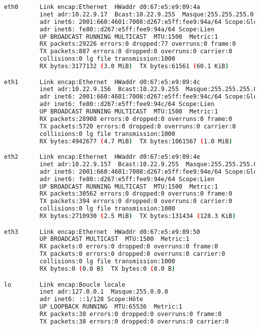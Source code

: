 \documentclass[french]{article}
\begin{document}
\begin{lstlisting}[language=bash,caption={ifconfig},frame=single]
eth0      Link encap:Ethernet  HWaddr d0:67:e5:e9:09:4a  
          inet adr:10.22.9.17  Bcast:10.22.9.255  Masque:255.255.255.0
          adr inet6: 2001:660:4601:7008:d267:e5ff:fee9:94a/64 Scope:Global
          adr inet6: fe80::d267:e5ff:fee9:94a/64 Scope:Lien
          UP BROADCAST RUNNING MULTICAST  MTU:1500  Metric:1
          RX packets:29226 errors:0 dropped:77 overruns:0 frame:0
          TX packets:887 errors:0 dropped:0 overruns:0 carrier:0
          collisions:0 lg file transmission:1000 
          RX bytes:3177132 (3.0 MiB)  TX bytes:61561 (60.1 KiB)

eth1      Link encap:Ethernet  HWaddr d0:67:e5:e9:09:4c  
          inet adr:10.22.9.156  Bcast:10.22.9.255  Masque:255.255.255.0
          adr inet6: 2001:660:4601:7008:d267:e5ff:fee9:94c/64 Scope:Global
          adr inet6: fe80::d267:e5ff:fee9:94c/64 Scope:Lien
          UP BROADCAST RUNNING MULTICAST  MTU:1500  Metric:1
          RX packets:28908 errors:0 dropped:0 overruns:0 frame:0
          TX packets:5720 errors:0 dropped:0 overruns:0 carrier:0
          collisions:0 lg file transmission:1000 
          RX bytes:4942677 (4.7 MiB)  TX bytes:1061567 (1.0 MiB)

eth2      Link encap:Ethernet  HWaddr d0:67:e5:e9:09:4e  
          inet adr:10.22.9.157  Bcast:10.22.9.255  Masque:255.255.255.0
          adr inet6: 2001:660:4601:7008:d267:e5ff:fee9:94e/64 Scope:Global
          adr inet6: fe80::d267:e5ff:fee9:94e/64 Scope:Lien
          UP BROADCAST RUNNING MULTICAST  MTU:1500  Metric:1
          RX packets:30562 errors:0 dropped:0 overruns:0 frame:0
          TX packets:394 errors:0 dropped:0 overruns:0 carrier:0
          collisions:0 lg file transmission:1000 
          RX bytes:2710930 (2.5 MiB)  TX bytes:131434 (128.3 KiB)

eth3      Link encap:Ethernet  HWaddr d0:67:e5:e9:09:50  
          UP BROADCAST MULTICAST  MTU:1500  Metric:1
          RX packets:0 errors:0 dropped:0 overruns:0 frame:0
          TX packets:0 errors:0 dropped:0 overruns:0 carrier:0
          collisions:0 lg file transmission:1000 
          RX bytes:0 (0.0 B)  TX bytes:0 (0.0 B)

lo        Link encap:Boucle locale  
          inet adr:127.0.0.1  Masque:255.0.0.0
          adr inet6: ::1/128 Scope:Hôte
          UP LOOPBACK RUNNING  MTU:65536  Metric:1
          RX packets:38 errors:0 dropped:0 overruns:0 frame:0
          TX packets:38 errors:0 dropped:0 overruns:0 carrier:0
    
\end{lstlisting}
\end{document}

